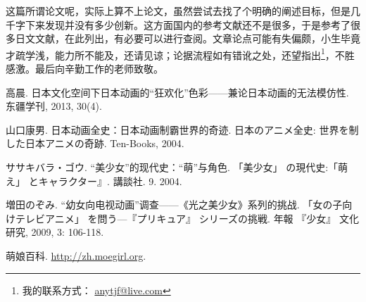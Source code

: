 \documentclass[cs5size,b5paper,nofonts]{ctexart}
\begin{document}
\begin{multicols}{2}
\smallskip

这篇所谓论文呢，实际上算不上论文，虽然尝试去找了个明确的阐述目标，但是几千字下来发现并没有多少创新。这方面国内的参考文献还不是很多，于是参考了很多日文文献，在此列出，有必要可以进行查阅。文章论点可能有失偏颇，小生毕竟才疏学浅，能力所不能及，还请见谅；论据流程如有错讹之处，还望指出\footnote{我的联系方式： \url{anytjf@live.com}}，不胜感激。最后向辛勤工作的老师致敬。

\begin{thebibliography}{10}
\item 高晨. 日本文化空间下日本动画的“狂欢化”色彩——兼论日本动画的无法模仿性. 东疆学刊, 2013, 30(4).
\item {\ja 山口康男}. 日本动画全史：日本动画制霸世界的奇迹. {\ja 日本のアニメ全史: 世界を制した日本アニメの奇跡}. Ten-Books, 2004.
\item {\ja ササキバラ・ゴウ}. “美少女”的现代史：“萌”与角色. {\ja 「美少女」 の現代史:「萌え」 とキャラクター』}. {\ja 講談社}. 9. 2004.
\item {\ja 増田のぞみ}. “幼女向电视动画”调查——《光之美少女》系列的挑战. {\ja 「女の子向けテレビアニメ」 を問う---『プリキュア』 シリーズの挑戦}. {\ja 年報 『少女』 文化研究}, 2009, 3: 106-118.
\item 萌娘百科. \url{http://zh.moegirl.org}.
\end{thebibliography}

\end{multicols}
\end{document}
